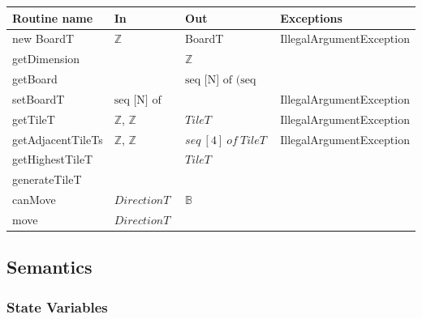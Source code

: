 \documentclass[12pt]{article}
\begin{document}
\begin{tabular}{| l | l | l | l |}
  \hline
  \textbf{Routine name} & \textbf{In}                            & \textbf{Out}                           & \textbf{Exceptions}        \\
  \hline
  new BoardT            & $\mathbb{Z}$                           & BoardT                                 & IllegalArgumentException   \\
  \hline
  getDimension          &                                        & $\mathbb{Z}$                           &                            \\
  \hline
  getBoard              &                                        & $\text{seq [N] of (seq [N] of TileT)}$ &                            \\
  \hline
  setBoardT             & $\text{seq [N] of (seq [N] of TileT)}$ &                                        & IllegalArgumentException   \\
  \hline
  getTileT              & $\mathbb{Z}$, $\mathbb{Z}$             & $TileT$                                & IllegalArgumentException   \\
  \hline
  getAdjacentTileTs     & $\mathbb{Z}$, $\mathbb{Z}$             & $seq\ [4]\ of\ TileT$                  & IllegalArgumentException   \\
  \hline
  getHighestTileT       &                                        & $TileT$                                &                            \\
  \hline
  generateTileT         &                                        &                                        &                            \\
  \hline
  canMove               & $DirectionT$                           & $\mathbb{B}$                           &                            \\
  \hline
  move                  & $DirectionT$                           &                                        &                            \\
  \hline
\end{tabular}

\subsection* {Semantics}

\subsubsection* {State Variables}
\end{document}
